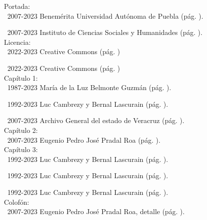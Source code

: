 \documentclass[14pt,twoside,final]{extbook} %
\begin{document}
\noindent Portada: \\

\noindent\textcopyright\ 2007-2023 Benemérita Universidad Autónoma de Puebla (pág. \pageref{fig:buap}).

\noindent\textcopyright\ 2007-2023 Instituto de Ciencias Sociales y Humanidades (pág. \pageref{fig:icsyh}). \\

\noindent Licencia: \\

\noindent\textcopyright\ 2022-2023 Creative Commons (pág. \pageref{fig:cc-large})

\noindent\textcopyright\ 2022-2023 Creative Commons (pág. \pageref{fig:cc-large}) \\

\noindent Capítulo 1: \\

\noindent\textcopyright\ 1987-2023 María de la Luz Belmonte Guzmán (pág. \pageref{fig:veracruz-1857}).

\noindent\textcopyright\ 1992-2023 Luc Cambrezy y Bernal Lascurain (pág. \pageref{fig:jalacingo-principios-xx}).

\noindent\textcopyright\ 2007-2023 Archivo General del estado de Veracruz (pág. \pageref{fig:progreso-industrial}). \\

\noindent Capítulo 2: \\

\noindent\textcopyright\ 2007-2023 Eugenio Pedro José Pradal Roa (pág. \pageref{fig:jalacingo-photo}). \\

\noindent Capítulo 3: \\

\noindent\textcopyright\ 1992-2023 Luc Cambrezy y Bernal Lascurain (pág. \pageref{fig:hda-limon}).

\noindent\textcopyright\ 1992-2023 Luc Cambrezy y Bernal Lascurain (pág. \pageref{fig:hda-cuatotolapam}).

\noindent\textcopyright\ 1992-2023 Luc Cambrezy y Bernal Lascurain (pág. \pageref{fig:hda-tenextepec}). \\

\noindent Colofón: \\

\noindent\textcopyright\ 2007-2023 Eugenio Pedro José Pradal Roa, detalle (pág. \pageref{fig:vineta}). \\
\end{document}
